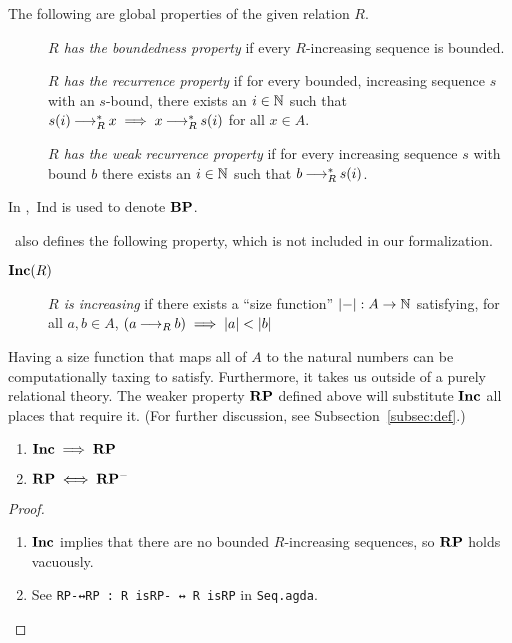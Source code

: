 \begin{definition} \label{def:rp}
  The following are global properties of the given relation $R$.  \hfill
    \begin{description}
        \item[] \emph{$R$ has the boundedness property} if every $R$-increasing sequence is bounded.
        \item[] \emph{$R$ has the recurrence property} if for every bounded, increasing sequence $s$ with an $s$-bound, there exists an $i \in \mathbb{N}$ such that
        $s (i) \mathbin{\longrightarrow_R^*} x \implies x \mathbin{\longrightarrow_R^*} s (i)$ for all $x\in A$.
        \item[] \emph{$R$ has the weak recurrence property} if for every increasing sequence $s$ with bound $b$ there exists an $i \in \mathbb{N}$ such that $b \mathbin{\longrightarrow_R^*} s (i)$.
    \end{description}
\end{definition}

In \terese, $\mathrm{\,Ind}$ is used to denote $\mathbf{BP}$.

\terese $\,$ also defines the following property, which is not included in our formalization.

\begin{definition} \hfill
    \begin{description}
        \item[$\mathbf{Inc}(R)$] \emph{$R$ is increasing} if there exists a ``size function'' $|{-}| : A \to \mathbb{N}$ satisfying, for all $a, b \in A$,
        $(a \mathbin{\longrightarrow_R} b) \implies |a| < |b|$
    \end{description}
\end{definition}

Having a size function that maps all of $A$ to the natural numbers can be computationally taxing to satisfy.
Furthermore, it takes us outside of a purely relational theory. The weaker property $\mathbf{RP}$ defined above will substitute $\mathbf{Inc}$ all places that require it. (For further discussion, see Subsection~\ref{subsec:def}.)

\begin{proposition}\hfill
    \begin{enumerate}
        \item $\mathbf{Inc} \implies \mathbf{RP}$
        \item $\mathbf{RP} \iff \mathbf{RP^{-}}$
    \end{enumerate}
\end{proposition}

\begin{proof} \hfill
    \begin{enumerate}
        \item $\mathbf{Inc}$ implies that there are no bounded $R$-increasing sequences,
        so $\mathbf{RP}$ holds vacuously.
        \item See \verb|RP-↔RP : R isRP- ↔ R isRP| in \texttt{Seq.agda}. \qedhere
    \end{enumerate}
\end{proof}

